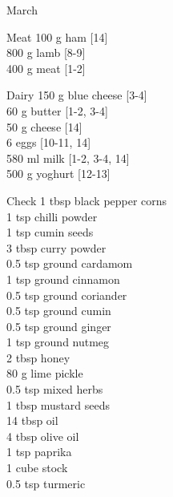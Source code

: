 \begin{menu}{March}
      \begin{shoppinglist}{Meat}
      100 g ham {\scriptsize[14]}\\
      800 g lamb {\scriptsize[8-9]}\\
      400 g meat {\scriptsize[1-2]}\\
      \end{shoppinglist}%
      \begin{shoppinglist}{Dairy}
      150 g blue cheese {\scriptsize[3-4]}\\
      60 g butter {\scriptsize[1-2, 3-4]}\\
      50 g cheese {\scriptsize[14]}\\
      6  eggs {\scriptsize[10-11, 14]}\\
      580 ml milk {\scriptsize[1-2, 3-4, 14]}\\
      500 g yoghurt {\scriptsize[12-13]}\\
      \end{shoppinglist}%
      \par\vfil %
      \vfil\clearpage %
      \begin{shoppinglist}{Check}
      1 tbsp black pepper corns \\
      1 tsp chilli powder \\
      1 tsp cumin seeds \\
      3 tbsp curry powder \\
      0.5 tsp ground cardamom \\
      1 tsp ground cinnamon \\
      0.5 tsp ground coriander \\
      0.5 tsp ground cumin \\
      0.5 tsp ground ginger \\
      1 tsp ground nutmeg \\
      2 tbsp honey \\
      80 g lime pickle \\
      0.5 tsp mixed herbs \\
      1 tbsp mustard seeds \\
      14 tbsp oil \\
      4 tbsp olive oil \\
      1 tsp paprika \\
      1 cube stock \\
      0.5 tsp turmeric \\
      \end{shoppinglist}%

\end{menu}
